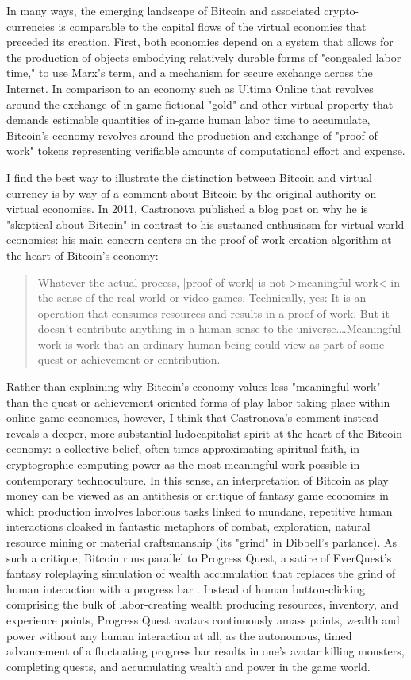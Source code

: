 In many ways, the emerging landscape of Bitcoin and associated crypto-currencies is comparable to the capital flows of the virtual economies that preceded its creation. First, both economies depend on a system that allows for the production of objects embodying relatively durable forms of "congealed labor time," to use Marx's term, and a mechanism for secure exchange across the Internet. In comparison to an economy such as Ultima Online that revolves around the exchange of in-game fictional "gold" and other virtual property that demands estimable quantities of in-game human labor time to accumulate, Bitcoin's economy revolves around the production and exchange of "proof-of-work" tokens representing verifiable amounts of computational effort and expense.

I find the best way to illustrate the distinction between Bitcoin and virtual currency is by way of a comment about Bitcoin by the original authority on virtual economies. In 2011, Castronova published a blog post on why he is "skeptical about Bitcoin" in contrast to his sustained enthusiasm for virtual world economies: his main concern centers on the proof-of-work creation algorithm at the heart of Bitcoin's economy:
\blockcquote{CastronovaBitcoin}{
  Whatever the actual process, |proof-of-work| is not >meaningful work< in the sense of the real world or video games. Technically, yes: It is an operation that consumes resources and results in a proof of work. But it doesn't contribute anything in a human sense to the universe.…Meaningful work is work that an ordinary human being could view as part of some quest or achievement or contribution.
}
Rather than explaining why Bitcoin's economy values less "meaningful work" than the quest or achievement-oriented forms of play-labor taking place within online game economies, however, I think that Castronova's comment instead reveals a deeper, more substantial ludocapitalist spirit at the heart of the Bitcoin economy: a collective belief, often times approximating spiritual faith, in cryptographic computing power as the most meaningful work possible in contemporary technoculture. In this sense, an interpretation of Bitcoin as play money can be viewed as an antithesis or critique of fantasy game economies in which production involves laborious tasks linked to mundane, repetitive human interactions cloaked in fantastic metaphors of combat, exploration, natural resource mining or material craftsmanship (its "grind" in Dibbell's parlance). As such a critique, Bitcoin runs parallel to Progress Quest, a satire of EverQuest's fantasy roleplaying simulation of wealth accumulation that replaces the grind of human interaction with a progress bar \autocite{ProgressQuest}. Instead of human button-clicking comprising the bulk of labor-creating wealth producing resources, inventory, and experience points, Progress Quest avatars continuously amass points, wealth and power without any human interaction at all, as the autonomous, timed advancement of a fluctuating progress bar results in one's avatar killing monsters, completing quests, and accumulating wealth and power in the game world.

